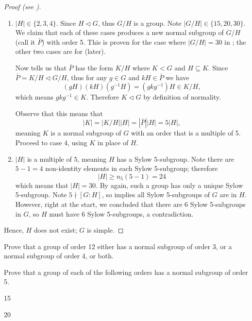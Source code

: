 \begin{proof}[Proof (see {\cite[Proposition 4.21]{dummit_foote_2004}})]
\begin{enumerate}
        \item $|H| \in \{2, 3, 4\}$. Since $H \lhd G$, thus $G/H$ is a group. Note $|G/H| \in \{15, 20, 30\}$. We claim that each of these cases produces a new normal subgroup of $G/H$ (call it $\bar{P}$) with order 5. This is proven for the case where $|G/H| = 30$ in ; the other two cases are for  (later).

        Now  tells us that $\bar{P}$ has the form $K/H$ where $K < G$ and $H \subseteq K$. Since $\bar{P} = K/H \lhd G/H$, thus for any $g \in G$ and $kH \in \bar{P}$ we have
        \[
            (gH)(kH)(g^{-1}H) = (gkg^{-1})H \in K/H,
        \]
        which means $gkg^{-1} \in K$. Therefore $K \lhd G$ by definition of normality.

        Observe that this means that
        \[
            |K| = |K/H||H| = |\bar{P}||H| = 5|H|,
        \]
        meaning $K$ is a normal subgroup of $G$ with an order that is a multiple of 5. Proceed to case 4, using $K$ in place of $H$.

        \item $|H|$ is a multiple of 5, meaning $H$ has a Sylow 5-subgroup. Note there are $5-1=4$ non-identity elements in each Sylow 5-subgroup; therefore
        \[
            |H| \geq n_5(5-1) = 24
        \]
        which means that $|H| = 30$. By  again, such a group has only a unique Sylow 5-subgroup.  Note $5 \nmid [G:H]$, so  implies all Sylow 5-subgroups of $G$ are in $H$. However, right at the start, we concluded that there are 6 Sylow 5-subgroups in $G$, so $H$ must have 6 Sylow 5-subgroups, a contradiction.
    \end{enumerate}
    Hence, $H$ does not exist; $G$ is simple.
\end{proof}

\begin{exercise}\label{exercise-group-of-order-12-has-normal-subgroup-of-3-or-4}
    Prove that a group of order 12 either has a normal subgroup of order 3, or a normal subgroup of order 4, or both.
\end{exercise}

\begin{exercise}\label{exercise-group-of-order-15-or-20-has-normal-subgroup-of-order-5}
    Prove that a group of each of the following orders has a normal subgroup of order 5.
    \begin{partquestions}{\alph*}
        \item 15
        \item 20
    \end{partquestions}
\end{exercise}

